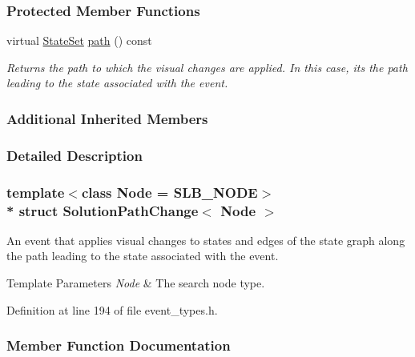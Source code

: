 \subsubsection*{Protected Member Functions}
\begin{DoxyCompactItemize}
\item 
virtual \hyperlink{structUniformChange_afc89af5d5e897d7664eb9ae7770d145c}{State\+Set} \hyperlink{structSolutionPathChange_a445206d31b2cefe2e0a25058186e3867}{path} () const 
\begin{DoxyCompactList}\small\item\em Returns the path to which the visual changes are applied. In this case, it\textquotesingle{}s the path leading to the state associated with the event. \end{DoxyCompactList}\end{DoxyCompactItemize}
\subsubsection*{Additional Inherited Members}


\subsubsection{Detailed Description}
\subsubsection*{template$<$class Node = S\+L\+B\+\_\+\+N\+O\+DE$>$\\*
struct Solution\+Path\+Change$<$ Node $>$}

An event that applies visual changes to states and edges of the state graph along the path leading to the state associated with the event. 


\begin{DoxyTemplParams}{Template Parameters}
{\em Node} & The search node type. \\
\hline
\end{DoxyTemplParams}


Definition at line 194 of file event\+\_\+types.\+h.



\subsubsection{Member Function Documentation}
